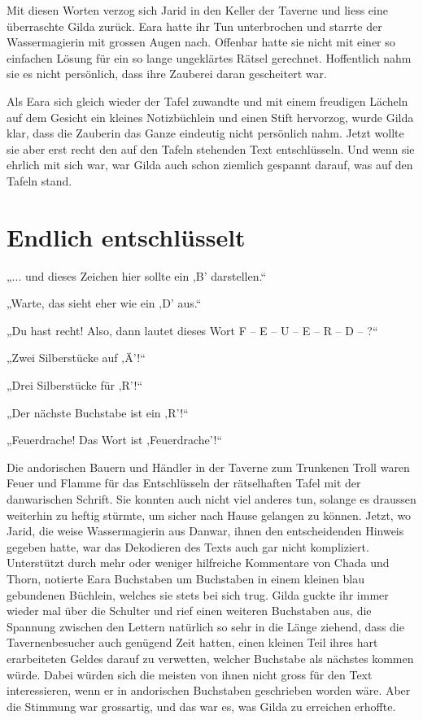 Mit diesen Worten verzog sich Jarid in den Keller der Taverne und liess eine überraschte Gilda zurück. Eara hatte ihr Tun unterbrochen und starrte der Wassermagierin mit grossen Augen nach. Offenbar hatte sie nicht mit einer so einfachen Lösung für ein so lange ungeklärtes Rätsel gerechnet. Hoffentlich nahm sie es nicht persönlich, dass ihre Zauberei daran gescheitert war.

Als Eara sich gleich wieder der Tafel zuwandte und mit einem freudigen Lächeln auf dem Gesicht ein kleines Notizbüchlein und einen Stift hervorzog, wurde Gilda klar, dass die Zauberin das Ganze eindeutig nicht persönlich nahm. Jetzt wollte sie aber erst recht den auf den Tafeln stehenden Text entschlüsseln. Und wenn sie ehrlich mit sich war, war Gilda auch schon ziemlich gespannt darauf, was auf den Tafeln stand.








\newpage
\section{Endlich entschlüsselt}



„... und dieses Zeichen hier sollte ein ‚B’ darstellen.“

„Warte, das sieht eher wie ein ‚D’ aus.“

„Du hast recht! Also, dann lautet dieses Wort F – E – U – E – R – D – ?“

„Zwei Silberstücke auf ‚Ä’!“

„Drei Silberstücke für ‚R’!“

„Der nächste Buchstabe ist ein ‚R’!“

„Feuerdrache! Das Wort ist ‚Feuerdrache’!“\bigskip



Die andorischen Bauern und Händler in der Taverne zum Trunkenen Troll waren Feuer und Flamme für das Entschlüsseln der rätselhaften Tafel mit der danwarischen Schrift. Sie konnten auch nicht viel anderes tun, solange es draussen weiterhin zu heftig stürmte, um sicher nach Hause gelangen zu können. Jetzt, wo Jarid, die weise Wassermagierin aus Danwar, ihnen den entscheidenden Hinweis gegeben hatte, war das Dekodieren des Texts auch gar nicht kompliziert. Unterstützt durch mehr oder weniger hilfreiche Kommentare von Chada und Thorn, notierte Eara Buchstaben um Buchstaben in einem kleinen blau gebundenen Büchlein, welches sie stets bei sich trug. Gilda guckte ihr immer wieder mal über die Schulter und rief einen weiteren Buchstaben aus, die Spannung zwischen den Lettern natürlich so sehr in die Länge ziehend, dass die Tavernenbesucher auch genügend Zeit hatten, einen kleinen Teil ihres hart erarbeiteten Geldes darauf zu verwetten, welcher Buchstabe als nächstes kommen würde. Dabei würden sich die meisten von ihnen nicht gross für den Text interessieren, wenn er in andorischen Buchstaben geschrieben worden wäre. Aber die Stimmung war grossartig, und das war es, was Gilda zu erreichen erhoffte.



